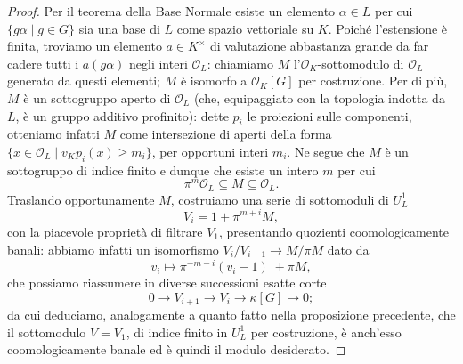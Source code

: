 \begin{proof}
	Per il teorema della Base Normale esiste un elemento $ \alpha \in L $ per cui $ \{ g\alpha \mid g \in G \} $ sia una base di $ L $ come spazio vettoriale su $ K $. Poiché l'estensione è finita, troviamo un elemento $ a \in K^\times $ di valutazione abbastanza grande da far cadere tutti i $ a (g\alpha) $ negli interi $ \mathcal{O}_L $: chiamiamo $ M $ l'$ \mathcal{O}_K $-sottomodulo di $ \mathcal{O}_L $ generato da questi elementi; $ M $ è isomorfo a $ \mathcal{O}_K[G] $ per costruzione.  
	Per di più, $ M $ è un sottogruppo aperto di $ \mathcal{O}_L $ (che, equipaggiato con la topologia indotta da $ L $, è un gruppo additivo profinito): dette $ p_i $ le proiezioni sulle componenti, otteniamo infatti $ M $ come intersezione di aperti della forma $ \{ x \in \mathcal{O}_L \mid v_K p_i (x) \geq m_i\} $, per opportuni interi $ m_i $. Ne segue che $ M $ è un sottogruppo di indice finito e dunque che esiste un intero $ m $ per cui
	\[  \pi^m\mathcal{O}_L\subseteq M \subseteq \mathcal{O}_L. \]
	Traslando opportunamente $ M $, costruiamo una serie di sottomoduli di $ U_L^1 $ 
	\[ V_i = 1 + \pi^{m+i}M, \]
	con la piacevole proprietà di filtrare $ V_1 $, presentando quozienti coomologicamente banali: abbiamo infatti un isomorfismo $ V_i/V_{i+1} \to M/\pi M $ dato da $$  v_i \mapsto \pi^{-m-i}(v_i-1) \; +\pi M,  $$ che possiamo riassumere in diverse successioni esatte corte
	\[ 0 \to V_{i+1} \to V_i \to \kappa [G] \to 0; \]
	da cui deduciamo, analogamente a quanto fatto nella proposizione precedente, che il sottomodulo $ V= V_1 $, di indice finito in $ U_L^1 $ per costruzione, è anch'esso coomologicamente banale ed è quindi il modulo desiderato.
\end{proof}

